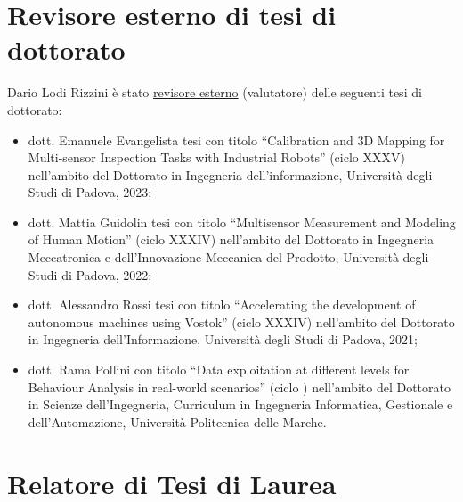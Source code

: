 \documentclass[11pt]{article}
\begin{document}
\section*{Revisore esterno di tesi di dottorato}

Dario Lodi Rizzini \`e stato \underline{revisore esterno} (valutatore) delle seguenti tesi di dottorato:  
%
\begin{itemize}
\item dott. Emanuele Evangelista tesi con titolo ``Calibration and 3D Mapping for Multi-sensor Inspection Tasks with Industrial Robots'' (ciclo XXXV) nell'ambito del Dottorato in Ingegneria dell’informazione, Universit\`a degli Studi di Padova, 2023; 
\item dott. Mattia Guidolin tesi con titolo ``Multisensor Measurement and Modeling of Human Motion'' (ciclo XXXIV) nell'ambito del Dottorato in Ingegneria Meccatronica e dell'Innovazione Meccanica del Prodotto, Universit\`a degli Studi di Padova, 2022; 
\item dott. Alessandro Rossi tesi con titolo ``Accelerating the development of autonomous machines using Vostok'' (ciclo XXXIV) nell'ambito del Dottorato in Ingegneria dell'Informazione, Universit\`a degli Studi di Padova, 2021; 
\item dott. Rama Pollini con titolo ``Data exploitation at different levels for Behaviour Analysis in real-world scenarios'' (ciclo ) nell'ambito del Dottorato in Scienze dell'Ingegneria, Curriculum in Ingegneria Informatica, Gestionale e dell'Automazione, Universit\`a Politecnica delle Marche. 
\end{itemize}

\section*{Relatore di Tesi di Laurea}
\end{document}
